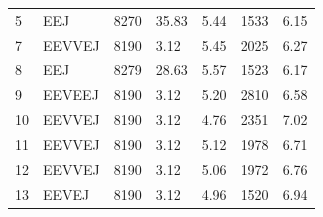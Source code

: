 \documentclass[letterpaper, preprint, paper,11pt]{AAS}	%
\begin{document}
\begin{table}[h!]
\begin{tabular}{lllllll}
        5                           & EEJ                        & 8270                            & 35.83                                                  & 5.44                                                    & 1533                       & 6.15                                                             \\
        7                           & EEVVEJ                     & 8190                            & 3.12                                                   & 5.45                                                    & 2025                       & 6.27                                                             \\
        8                           & EEJ                        & 8279                            & 28.63                                                  & 5.57                                                    & 1523                       & 6.17                                                             \\
        \rowcolor{lightgray}9       & EEVEEJ                     & 8190                            & 3.12                                                   & 5.20                                                    & 2810                       & 6.58                                                             \\
        10                          & EEVVEJ                     & 8190                            & 3.12                                                   & 4.76                                                    & 2351                       & 7.02                                                             \\
        11                          & EEVVEJ                     & 8190                            & 3.12                                                   & 5.12                                                    & 1978                       & 6.71                                                             \\
        12                          & EEVVEJ                     & 8190                            & 3.12                                                   & 5.06                                                    & 1972                       & 6.76                                                             \\
        13                          & EEVEJ                      & 8190                            & 3.12                                                   & 4.96                                                    & 1520                       & 6.94                                                             \\

\end{tabular}
\end{table}
\end{document}
